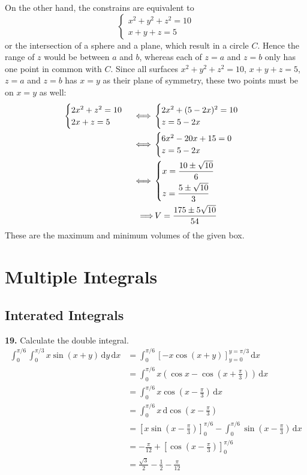 \documentclass[a4paper,12pt]{article}
\newcommand{\ud}{\,\mathrm{d}}
\newcommand{\exercise}[1]{\noindent\textbf{#1.}}
\begin{document}
On the other hand, the constrains are equivalent to
\[\begin{cases}
  x^2 + y^2 + z^2 = 10\\
  x + y + z = 5
\end{cases}\]
or the intersection of a sphere and a plane, which result in a circle $C$.
Hence the range of $z$ would be between $a$ and $b$, whereas each of $z = a$
and $z = b$ only has one point in common with $C$. Since all surfaces
$x^2 + y^2 + z^2 = 10$, $x + y + z = 5$, $z = a$ and $z = b$ has $x = y$
as their plane of symmetry, these two points must be on $x = y$ as well:
\begin{align*}
  \begin{cases}
    2x^2 + z^2 = 10\\
    2x + z = 5
  \end{cases}
  \iff&\begin{cases}
    2x^2 + (5 - 2x)^2 = 10\\
    z = 5 - 2x
  \end{cases}\\
  \iff&\begin{cases}
    6x^2 - 20x + 15 = 0\\
    z = 5 - 2x
  \end{cases}\\
  \iff&\begin{dcases}
    x = \frac{10 \pm \sqrt{10}}{6}\\
    z = \frac{5 \pm \sqrt{10}}{3}
  \end{dcases}\\
  \Longrightarrow &\,V = \dfrac{175 \pm 5\sqrt{10}}{54}
\end{align*}
These are the maximum and minimum volumes of the given box.

\section{Multiple Integrals}
\setcounter{subsection}{1}
\subsection{Interated Integrals}
\exercise{19} Calculate the double integral.
\begin{align*}
   \int_0^{\pi/6}\int_0^{\pi/3}x\sin(x + y)\ud y\ud x
&= \int_0^{\pi/6}\left[-x\cos(x + y)\right]_{y=0}^{y=\pi/3}\ud x\\
&= \int_0^{\pi/6}x\left(\cos x - \cos\left(x + \frac\pi 3\right)\right)\ud x\\
&= \int_0^{\pi/6}x\cos\left(x - \frac\pi 3\right)\ud x\\
&= \int_0^{\pi/6}x\ud\cos\left(x - \frac\pi 3\right)\\
&= \left[x\sin\left(x - \frac\pi 3\right)\right]_0^{\pi/6}
 - \int_0^{\pi/6}\sin\left(x - \frac\pi 3\right)\ud x\\
&= -\frac{\pi}{12} + \left[\cos\left(x - \frac\pi 3\right)\right]_0^{\pi/6}\\
&= \frac{\sqrt 3}{2} - \frac{1}{2} - \frac{\pi}{12}
\end{align*}
\end{document}

